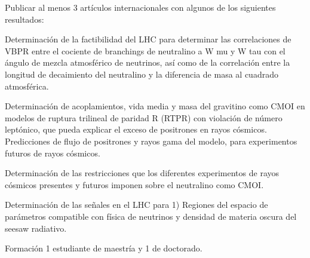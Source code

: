 Publicar al menos 3 artículos internacionales con algunos de los siguientes resultados:

Determinación de la factibilidad del LHC para determinar las correlaciones de VBPR entre el cociente de branchings de neutralino a W mu y W tau con el ángulo de mezcla atmosférico de neutrinos, así como de la correlación entre la longitud de decaimiento del neutralino y la diferencia de masa al cuadrado atmosférica.

Determinación de acoplamientos, vida media y masa del gravitino como CMOI en modelos de ruptura trilineal de paridad R (RTPR) con violación de número leptónico, que pueda explicar el exceso de positrones en rayos cósmicos. Predicciones de flujo de positrones y rayos gama del modelo, para experimentos futuros de rayos cósmicos. 

Determinación de las restricciones que los diferentes experimentos de rayos cósmicos 
presentes y futuros imponen sobre el neutralino como CMOI. 

Determinación de las señales en el LHC para 1) Regiones del espacio de parámetros compatible con física de neutrinos y densidad de materia oscura del seesaw radiativo. 

Formación 1 estudiante de maestría y 1 de doctorado.

